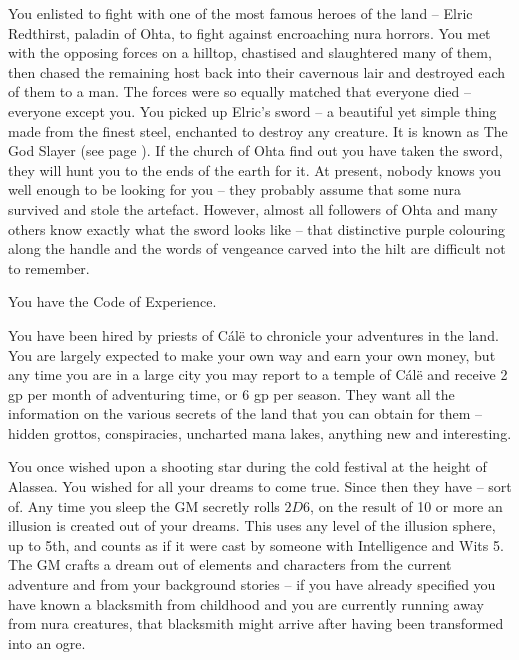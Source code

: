 \begin{multicols}{2}
\begin{list}{\addtocounter{list}{1}\textbf{:}}{\raggedleft}
  \item
  You enlisted to fight with one of the most famous heroes of the land -- Elric Redthirst, paladin of Ohta, to fight against encroaching nura horrors.
  You met with the opposing forces on a hilltop, chastised and slaughtered many of them, then chased the remaining host back into their cavernous lair and destroyed each of them to a man.
  The forces were so equally matched that everyone died -- everyone except you.
  You picked up Elric's sword -- a beautiful yet simple thing made from the finest steel, enchanted to destroy any creature.
  It is known as The God Slayer (see page \pageref{godslayer}).
  If the church of Ohta find out you have taken the sword, they will hunt you to the ends of the earth for it.
  At present, nobody knows you well enough to be looking for you -- they probably assume that some nura survived and stole the artefact.
  However, almost all followers of Ohta and many others know exactly what the sword looks like -- that distinctive purple colouring along the handle and the words of vengeance carved into the hilt are difficult not to remember.

  You have the Code of Experience.

  \item
  You have been hired by priests of C\'{a}l\"{e} to chronicle your adventures in the land.
  You are largely expected to make your own way and earn your own money, but any time you are in a large city you may report to a temple of C\'{a}l\"{e} and receive 2 gp per month of adventuring time, or 6 gp per season.
  They want all the information on the various secrets of the land that you can obtain for them -- hidden grottos, conspiracies, uncharted mana lakes, anything new and interesting.

  \item
  You once wished upon a shooting star during the cold festival at the height of Alassea.
  You wished for all your dreams to come true.
  Since then they have -- sort of.
  Any time you sleep the GM secretly rolls $2D6$, on the result of 10 or more an illusion is created out of your dreams.
  This uses any level of the illusion sphere, up to 5th, and counts as if it were cast by someone with Intelligence and Wits 5.
  The GM crafts a dream out of elements and characters from the current adventure and from your background stories -- if you have already specified you have known a blacksmith from childhood and you are currently running away from nura creatures, that blacksmith might arrive after having been transformed into an ogre.


\end{list}
\end{multicols}
